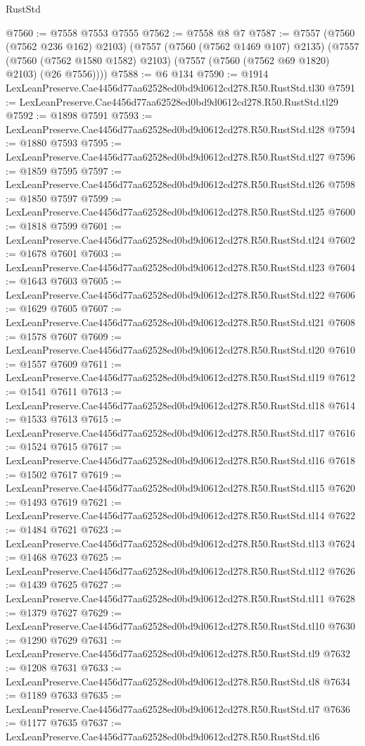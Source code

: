 \begin{lexlean}{RustStd}
\begin{coremodule}
@7560 := @7558 @7553 @7555
@7562 := @7558 @8 @7
@7587 := @7557
    (@7560 (@7562 @236 @162) @2103)
    (@7557
      (@7560 (@7562 @1469 @107) @2135)
      (@7557 (@7560 (@7562 @1580 @1582) @2103) (@7557 (@7560 (@7562 @69 @1820) @2103) (@26 @7556))))
@7588 := @6 @134
@7590 := @1914 LexLeanPreserve.Cae4456d77aa62528ed0bd9d0612cd278.R50.RustStd.tl30
@7591 := LexLeanPreserve.Cae4456d77aa62528ed0bd9d0612cd278.R50.RustStd.tl29
@7592 := @1898 @7591
@7593 := LexLeanPreserve.Cae4456d77aa62528ed0bd9d0612cd278.R50.RustStd.tl28
@7594 := @1880 @7593
@7595 := LexLeanPreserve.Cae4456d77aa62528ed0bd9d0612cd278.R50.RustStd.tl27
@7596 := @1859 @7595
@7597 := LexLeanPreserve.Cae4456d77aa62528ed0bd9d0612cd278.R50.RustStd.tl26
@7598 := @1850 @7597
@7599 := LexLeanPreserve.Cae4456d77aa62528ed0bd9d0612cd278.R50.RustStd.tl25
@7600 := @1818 @7599
@7601 := LexLeanPreserve.Cae4456d77aa62528ed0bd9d0612cd278.R50.RustStd.tl24
@7602 := @1678 @7601
@7603 := LexLeanPreserve.Cae4456d77aa62528ed0bd9d0612cd278.R50.RustStd.tl23
@7604 := @1643 @7603
@7605 := LexLeanPreserve.Cae4456d77aa62528ed0bd9d0612cd278.R50.RustStd.tl22
@7606 := @1629 @7605
@7607 := LexLeanPreserve.Cae4456d77aa62528ed0bd9d0612cd278.R50.RustStd.tl21
@7608 := @1578 @7607
@7609 := LexLeanPreserve.Cae4456d77aa62528ed0bd9d0612cd278.R50.RustStd.tl20
@7610 := @1557 @7609
@7611 := LexLeanPreserve.Cae4456d77aa62528ed0bd9d0612cd278.R50.RustStd.tl19
@7612 := @1541 @7611
@7613 := LexLeanPreserve.Cae4456d77aa62528ed0bd9d0612cd278.R50.RustStd.tl18
@7614 := @1533 @7613
@7615 := LexLeanPreserve.Cae4456d77aa62528ed0bd9d0612cd278.R50.RustStd.tl17
@7616 := @1524 @7615
@7617 := LexLeanPreserve.Cae4456d77aa62528ed0bd9d0612cd278.R50.RustStd.tl16
@7618 := @1502 @7617
@7619 := LexLeanPreserve.Cae4456d77aa62528ed0bd9d0612cd278.R50.RustStd.tl15
@7620 := @1493 @7619
@7621 := LexLeanPreserve.Cae4456d77aa62528ed0bd9d0612cd278.R50.RustStd.tl14
@7622 := @1484 @7621
@7623 := LexLeanPreserve.Cae4456d77aa62528ed0bd9d0612cd278.R50.RustStd.tl13
@7624 := @1468 @7623
@7625 := LexLeanPreserve.Cae4456d77aa62528ed0bd9d0612cd278.R50.RustStd.tl12
@7626 := @1439 @7625
@7627 := LexLeanPreserve.Cae4456d77aa62528ed0bd9d0612cd278.R50.RustStd.tl11
@7628 := @1379 @7627
@7629 := LexLeanPreserve.Cae4456d77aa62528ed0bd9d0612cd278.R50.RustStd.tl10
@7630 := @1290 @7629
@7631 := LexLeanPreserve.Cae4456d77aa62528ed0bd9d0612cd278.R50.RustStd.tl9
@7632 := @1208 @7631
@7633 := LexLeanPreserve.Cae4456d77aa62528ed0bd9d0612cd278.R50.RustStd.tl8
@7634 := @1189 @7633
@7635 := LexLeanPreserve.Cae4456d77aa62528ed0bd9d0612cd278.R50.RustStd.tl7
@7636 := @1177 @7635
@7637 := LexLeanPreserve.Cae4456d77aa62528ed0bd9d0612cd278.R50.RustStd.tl6

\end{coremodule}
\end{lexlean}
